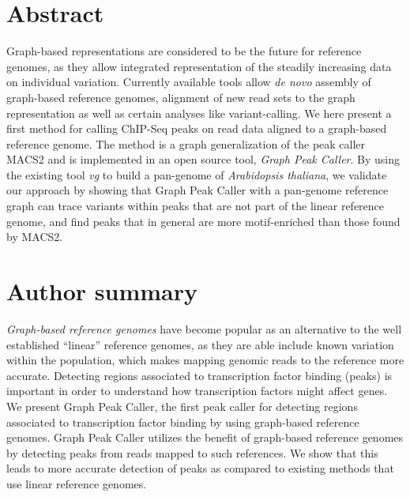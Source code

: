 \documentclass[10pt,letterpaper]{article}
\begin{document}
\section*{Abstract}

Graph-based representations are considered to be the future for reference genomes, as they allow integrated representation of the steadily increasing data on individual variation. Currently available tools allow \emph{de novo} assembly of  graph-based reference genomes, alignment of new read sets to the graph representation as well as certain analyses like variant-calling. We here present a first method for calling ChIP-Seq peaks on read data aligned to a graph-based reference genome. The method is a graph generalization of the peak caller MACS2 and is implemented in an open source tool, \emph{Graph Peak Caller}. By using the existing tool \emph{vg} to build a pan-genome of \emph{Arabidopsis thaliana}, we validate our approach by showing that Graph Peak Caller with a pan-genome reference graph can trace variants within peaks that are not part of the linear reference genome, and find peaks that in general are more motif-enriched than those found by MACS2. 

\section*{Author summary}
\emph{Graph-based reference genomes} have become popular as an alternative to the well established “linear” reference genomes, as they are able include known variation within the population, which makes mapping genomic reads to the reference more accurate. Detecting regions associated to transcription factor binding (peaks) is important in order to understand how transcription factors might affect genes. We present Graph Peak Caller, the first peak caller for detecting regions associated to transcription factor binding by using graph-based reference genomes. Graph Peak Caller utilizes the benefit of graph-based reference genomes by detecting peaks from reads mapped to such references. We show that this leads to more accurate detection of peaks as compared to existing methods that use linear reference genomes.



\end{document}

